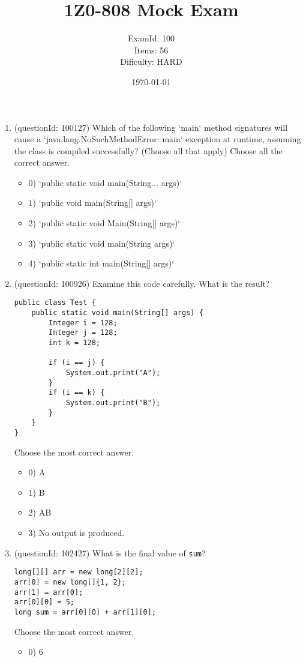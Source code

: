 \documentclass[12pt]{article}
\title{\textbf{1Z0-808 Mock Exam}}
\author{ExamId: 100 \\ Items: 56 \\ Dificulty: HARD}
\date{\today}
\begin{document}
\maketitle
\newpage\begin{enumerate}[label=(\arabic*)]
\item (questionId: 100127) Which of the following `main` method signatures will cause a `java.lang.NoSuchMethodError: main` exception at runtime, assuming the class is compiled successfully? (Choose all that apply)
Choose all the correct answer.\begin{itemize}
\item 0) `public static void main(String... args)`

\item 1) `public void main(String[] args)`

\item 2) `public static void Main(String[] args)`

\item 3) `public static void main(String args)`

\item 4) `public static int main(String[] args)`

\end{itemize}
\item (questionId: 100926) Examine this code carefully. What is the result?\n\begin{verbatim}
public class Test {
    public static void main(String[] args) {
        Integer i = 128;
        Integer j = 128;
        int k = 128;

        if (i == j) {
            System.out.print("A");
        }
        if (i == k) {
            System.out.print("B");
        }
    }
}
\end{verbatim}
Choose the most correct answer. 
\begin{itemize}
\item 0) A

\item 1) B

\item 2) AB

\item 3) No output is produced.

\end{itemize}
\item (questionId: 102427) What is the final value of \verb|sum|?\begin{verbatim}
long[][] arr = new long[2][2];
arr[0] = new long[]{1, 2};
arr[1] = arr[0];
arr[0][0] = 5;
long sum = arr[0][0] + arr[1][0];
\end{verbatim}
Choose the most correct answer. 
\begin{itemize}
\item 0) 6


\end{itemize}
\end{enumerate}
\end{document}
